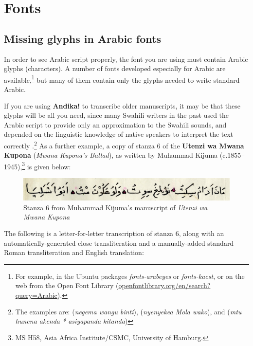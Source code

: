 \chapter{Fonts}
\label{ch:fonts}

\section{Missing glyphs in Arabic fonts}

In order to see Arabic script properly, the font you are using must contain Arabic glyphs (characters).  A number of fonts developed especially for Arabic are available,\footnote{For example, in the Ubuntu packages \textit{fonts-arabeyes} or \textit{fonts-kacst}, or on the web from the Open Font Library (\url{openfontlibrary.org/en/search?query=Arabic}).} but many of them contain only the glyphs needed to write standard Arabic.

If you are using \textbf{Andika!} to transcribe older manuscripts, it may be that these glyphs will be all you need, since many Swahili writers in the past used the Arabic script to provide only an approximation to the Swahili sounds, and depended on the linguistic knowledge of native speakers to interpret the text correctly \citep[p14-15]{Omar2002}.\footnote{The examples are:  (\textit{negema wangu binti}),  (\textit{nyenyekea Mola wako}), and  (\textit{mtu hunena akenda * asiyapanda kitanda})}  As a further example, a copy of stanza 6 of the \textbf{Utenzi wa Mwana Kupona} (\textit{Mwana Kupona's Ballad}), as written by Muhammad Kijuma (c.1855--1945),\footnote{MS H58, Asia Africa Institute/CSMC, University of Hamburg.} is given below:

\begin{figure}[h]
 \centering
 \includegraphics[keepaspectratio=true]{./images/mwanakuponas6.png}
  \caption{Stanza 6 from Muhammad Kijuma's manuscript of \textit{Utenzi wa Mwana Kupona}}
 \label{fig:mwanakupona}
\end{figure}

The following is a letter-for-letter transcription of stanza 6, along with an automatically-generated close transliteration and a manually-added standard Roman transliteration and English translation:

